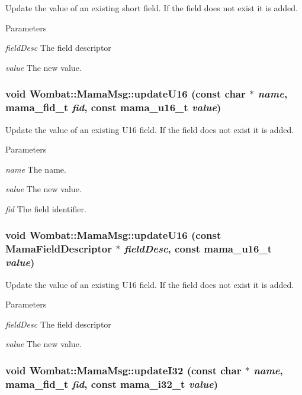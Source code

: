 Update the value of an existing short field. If the field does not exist it is added.


\begin{DoxyParams}{Parameters}
\item[{\em fieldDesc}]The field descriptor \item[{\em value}]The new value. \end{DoxyParams}
\hypertarget{classWombat_1_1MamaMsg_aef7f564a13e3d87bc292e54234f6a495}{
\subsubsection[{updateU16}]{\setlength{\rightskip}{0pt plus 5cm}void Wombat::MamaMsg::updateU16 (const char $\ast$ {\em name}, \/  mama\_\-fid\_\-t {\em fid}, \/  const mama\_\-u16\_\-t {\em value})}}
\label{classWombat_1_1MamaMsg_aef7f564a13e3d87bc292e54234f6a495}


Update the value of an existing U16 field. If the field does not exist it is added.


\begin{DoxyParams}{Parameters}
\item[{\em name}]The name. \item[{\em value}]The new value. \item[{\em fid}]The field identifier. \end{DoxyParams}
\hypertarget{classWombat_1_1MamaMsg_a451769347694f20b71f7336d74878d1e}{
\subsubsection[{updateU16}]{\setlength{\rightskip}{0pt plus 5cm}void Wombat::MamaMsg::updateU16 (const {\bf MamaFieldDescriptor} $\ast$ {\em fieldDesc}, \/  const mama\_\-u16\_\-t {\em value})}}
\label{classWombat_1_1MamaMsg_a451769347694f20b71f7336d74878d1e}


Update the value of an existing U16 field. If the field does not exist it is added.


\begin{DoxyParams}{Parameters}
\item[{\em fieldDesc}]The field descriptor \item[{\em value}]The new value. \end{DoxyParams}
\hypertarget{classWombat_1_1MamaMsg_aba18342b2417df030f35d1df366e4cdf}{
\subsubsection[{updateI32}]{\setlength{\rightskip}{0pt plus 5cm}void Wombat::MamaMsg::updateI32 (const char $\ast$ {\em name}, \/  mama\_\-fid\_\-t {\em fid}, \/  const mama\_\-i32\_\-t {\em value})}}
\label{classWombat_1_1MamaMsg_aba18342b2417df030f35d1df366e4cdf}


